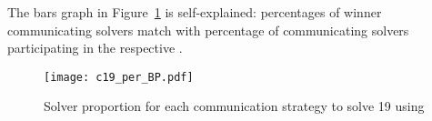 The bars graph in Figure~\ref{barplot:19} is self-explained: percentages of winner communicating solvers match with percentage of communicating solvers participating in the respective \commstr.

\begin{figure}[!h]
\centering
\texttt{[image: c19\_per\_BP.pdf]}
\caption{Solver proportion for each communication strategy to solve \CARRP{} 19 using \posl}\label{barplot:19}
\end{figure}